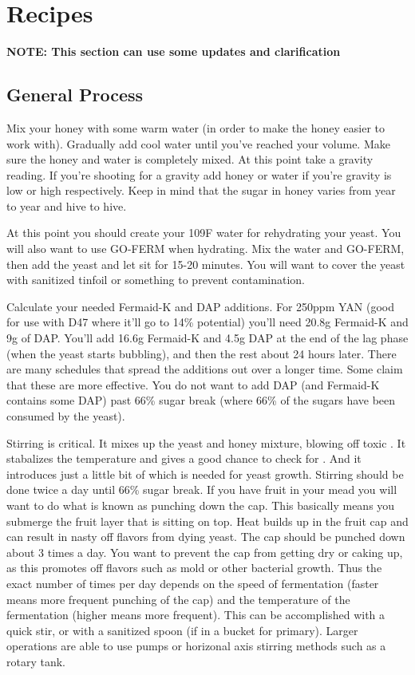 \section{Recipes}
 \textbf{NOTE: This section can use some updates and clarification}

 \subsection{General Process}
  Mix your honey with some warm water (in order to make the honey easier to work with). Gradually add cool water 
  until you've reached your volume. Make sure the honey and water is completely mixed. At this point take a 
  gravity reading. If you're shooting for a gravity add honey or water if you're gravity is low or high 
  respectively. Keep in mind that the sugar in honey varies from year to year and hive to hive.

  At this point you should create your 109\textdegree F water for rehydrating your yeast. You will also want to 
  use GO-FERM when hydrating. Mix the water and GO-FERM, then add the yeast and let sit for 15-20 minutes. 
  You will want to cover the yeast with sanitized tinfoil or something to prevent contamination.

  Calculate your needed Fermaid-K and DAP additions. For 250ppm YAN (good for use with D47 where it'll go 
  to 14\% potential) you'll need 20.8g Fermaid-K and 9g of DAP.
  You'll add 16.6g Fermaid-K and 4.5g DAP at the end of the lag phase (when the yeast starts bubbling), and 
  then the rest about 24 hours later. 
  There are many schedules that spread the additions out over a longer time. 
  Some claim that these are more effective. 
  You do not want to add DAP (and Fermaid-K contains some DAP) past 66\% sugar break (where 66\% of the sugars 
  have been consumed by the yeast).

  Stirring is critical. It mixes up the yeast and honey mixture, blowing off toxic . 
  It stabalizes the temperature and gives a good chance to check for . And it introduces just a little 
  bit of  which is needed for yeast growth.
  Stirring should be done twice a day until 66\% sugar break. If you have fruit in your mead you will want to do 
  what is known as punching down the cap.
  This basically means you submerge the fruit layer that is sitting on top. Heat builds up in the fruit cap and can 
  result in nasty off flavors from dying yeast.
  The cap should be punched down about 3 times a day. 
  You want to prevent the cap from getting dry or caking up, as this promotes off flavors such as mold or other 
  bacterial growth. 
  Thus the exact number of times per day depends on the speed of fermentation (faster means more frequent punching 
  of the cap) and the temperature of the fermentation (higher means more frequent).
  This can be accomplished with a quick stir, or with a sanitized spoon (if in a bucket for primary). 
  Larger operations are able to use pumps or horizonal axis stirring methods such as a rotary tank.


